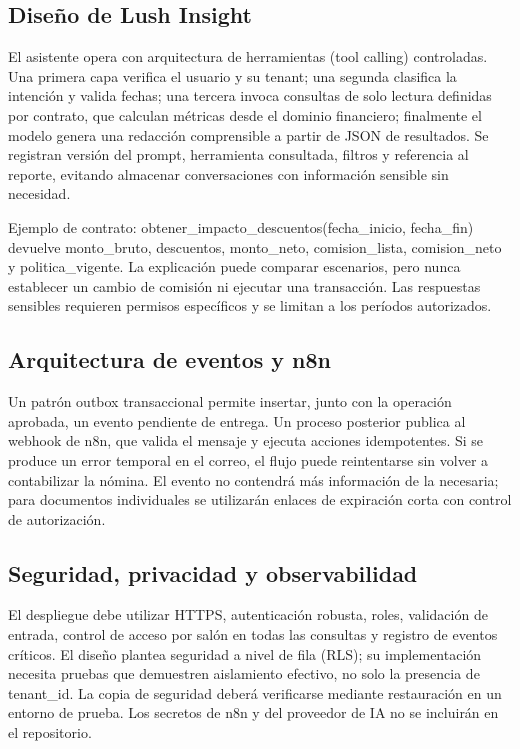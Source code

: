 \subsection{Diseño de Lush Insight}

El asistente opera con arquitectura de herramientas (tool calling) controladas. Una primera capa verifica el usuario y su tenant; una segunda clasifica la intención y valida fechas; una tercera invoca consultas de solo lectura definidas por contrato, que calculan métricas desde el dominio financiero; finalmente el modelo genera una redacción comprensible a partir de JSON de resultados. Se registran versión del prompt, herramienta consultada, filtros y referencia al reporte, evitando almacenar conversaciones con información sensible sin necesidad.


Ejemplo de contrato: obtener\_impacto\_descuentos(fecha\_inicio, fecha\_fin) devuelve monto\_bruto, descuentos, monto\_neto, comision\_lista, comision\_neto y politica\_vigente. La explicación puede comparar escenarios, pero nunca establecer un cambio de comisión ni ejecutar una transacción. Las respuestas sensibles requieren permisos específicos y se limitan a los períodos autorizados.


\subsection{Arquitectura de eventos y n8n}

Un patrón outbox transaccional permite insertar, junto con la operación aprobada, un evento pendiente de entrega. Un proceso posterior publica al webhook de n8n, que valida el mensaje y ejecuta acciones idempotentes. Si se produce un error temporal en el correo, el flujo puede reintentarse sin volver a contabilizar la nómina. El evento no contendrá más información de la necesaria; para documentos individuales se utilizarán enlaces de expiración corta con control de autorización.


\subsection{Seguridad, privacidad y observabilidad}

El despliegue debe utilizar HTTPS, autenticación robusta, roles, validación de entrada, control de acceso por salón en todas las consultas y registro de eventos críticos. El diseño plantea seguridad a nivel de fila (RLS); su implementación necesita pruebas que demuestren aislamiento efectivo, no solo la presencia de tenant\_id. La copia de seguridad deberá verificarse mediante restauración en un entorno de prueba. Los secretos de n8n y del proveedor de IA no se incluirán en el repositorio.


